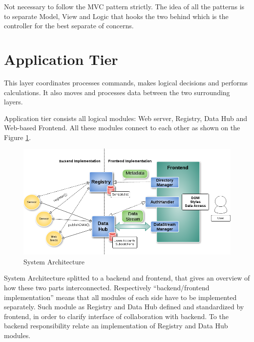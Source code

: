   Not necessary to follow the MVC pattern strictly. The idea of all the patterns is to separate Model, View and Logic that hooks the two behind which is the controller for the best separate of concerns.

\section{Application Tier}
  This layer coordinates processes commands, makes logical decisions and performs calculations. It also moves and processes data between the two surrounding layers.

  Application tier consists all logical modules: Web server, Registry, Data Hub and Web-based Frontend. All these modules connect to each other as shown on the Figure \ref{img:structure}. 
    \begin{figure}[!ht]
    \centering
    \includegraphics[scale=0.6]{images/Structure.png}   
    \caption[System Architecture]{System Architecture} 
    \label{img:structure}                        
    \end{figure}

    System Architecture splitted to a backend and frontend, that gives an overview of how these two parts interconnected. Respectively ``backend/frontend implementation'' means that all modules of each side have to be implemented separately. Such module as Registry and Data Hub defined and standardized by frontend, in order to clarify interface of collaboration with backend. To the backend responsibility relate an implementation of Registry and Data Hub modules.

